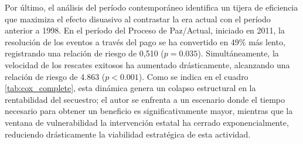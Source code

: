 \documentclass[12pt]{article}
\theoremstyle{definition}
\theoremstyle{remark}
\newcommand{\1}{\mathbf{1}}
\begin{document}
Por último, el análisis del período contemporáneo identifica un tijera de eficiencia que maximiza el efecto disuasivo al contrastar la era actual con el período anterior a 1998. En el período del Proceso de Paz/Actual, iniciado en 2011, la resolución de los eventos a través del pago se ha convertido en 49\% más lento, registrando una relación de riesgo de 0,510 ($p = 0.035$). Simultáneamente, la velocidad de los rescates exitosos ha aumentado drásticamente, alcanzando una relación de riesgo de 4.863 ($p < 0.001$). Como se indica en el cuadro \ref{tab:cox_complete}, esta dinámica genera un colapso estructural en la rentabilidad del secuestro; el autor se enfrenta a un escenario donde el tiempo necesario para obtener un beneficio es significativamente mayor, mientras que la ventana de vulnerabilidad la intervención estatal ha cerrado exponencialmente, reduciendo drásticamente la viabilidad estratégica de esta actividad.
\end{document}
